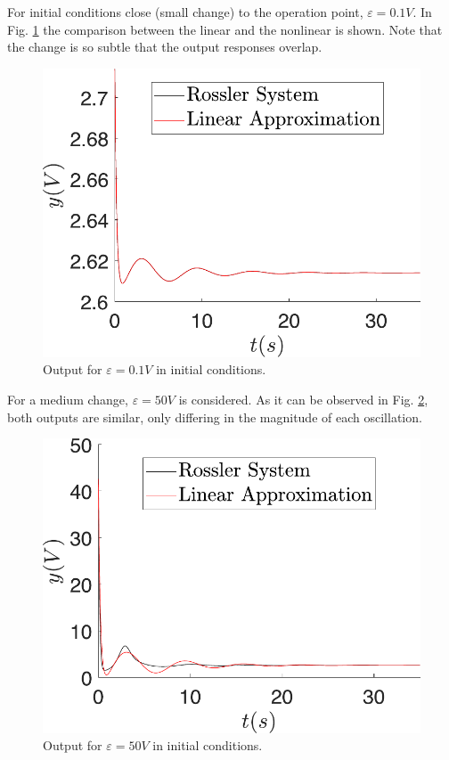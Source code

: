 For initial conditions close (small change) to the operation point, $\varepsilon=0.1V$. In Fig. \ref{fig:ci_x3_01} the comparison between the linear and the nonlinear is shown. Note that the change is so subtle that the output responses overlap.

\begin{figure}[H]
    \centering
    \includegraphics[scale=0.5]{figs/comparLinearVSNonlinear/Cerca_lineal_nl_01.pdf}
    \caption{Output for $\varepsilon=0.1V$ in initial conditions.}
    \label{fig:ci_x3_01}
\end{figure}


For a medium change, $\varepsilon=50V$ is considered. As it can be observed in Fig. \ref{fig:ci_x3_50}, both outputs are similar, only differing in the magnitude of each oscillation.

\begin{figure}[H]
    \centering
    \includegraphics[scale=0.5]{figs/comparLinearVSNonlinear/Medio_lineal_nl_50.pdf}
    \caption{Output for $\varepsilon=50V$ in initial conditions.}
    \label{fig:ci_x3_50}
\end{figure}

